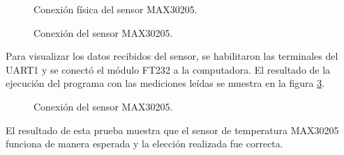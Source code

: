 \begin{figure}[htbp!]
	\centering
	\caption{Conexión física del sensor MAX30205.}
	\label{fig:ConexionFisicaMAX30205}
\end{figure}

\begin{figure}[htbp!]
	\centering
	\caption{Conexión del sensor MAX30205.}
	\label{fig:ConexionMAX30205}
\end{figure}

Para visualizar los datos recibidos del sensor, se habilitaron las terminales del UART1 y se conectó el módulo FT232 a la computadora. El resultado de la ejecución del programa con las mediciones leídas se muestra en la figura \ref{fig:ResultadoTerminalMAX30205}.\\

\begin{figure}[htbp!]
	\centering
	\caption{Conexión del sensor MAX30205.}
	\label{fig:ResultadoTerminalMAX30205}
\end{figure}

El resultado de esta prueba muestra que el sensor de temperatura MAX30205 funciona de manera esperada y la elección realizada fue correcta.

\clearpage